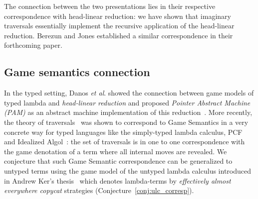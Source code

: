 \documentclass{elsarticle}
\theoremstyle{plain}
\theoremstyle{definition}
\theoremstyle{remark}
\newcommand{\etal}{\textit{et al}. }
\begin{document}
The connection between the two presentations lies in their respective correspondence with head-linear reduction: we have shown that imaginary traversals essentially implement the recursive application of the head-linear reduction. Berezun and Jones established a similar correspondence in their forthcoming paper.

\subsection*{Game semantics connection}

In the typed setting, Danos \etal showed the connection between game models of typed lambda and \emph{head-linear reduction} and proposed \emph{Pointer Abstract Machine (PAM)} as an abstract machine implementation of this reduction~\cite{danosherbelinregnier1996}.
More recently, the theory of traversals~\cite{OngLics2006} was shown to correspond to Game Semantics in a very concrete way for typed languages like the simply-typed lambda calculus, PCF and Idealized Algol~\cite{BlumPhd}: the set of traversals is in one to one correspondence with the game denotation of a term where all internal moves are revealed. We conjecture that such Game Semantic correspondence can be generalized to untyped terms using the game model of the untyped lambda calculus introduced in Andrew Ker's thesis~\cite{KerThesis} which denotes lambda-terms by \emph{effectively almost everywhere copycat} strategies (Conjecture~\ref{conj:ulc_corresp}).



\end{document}
